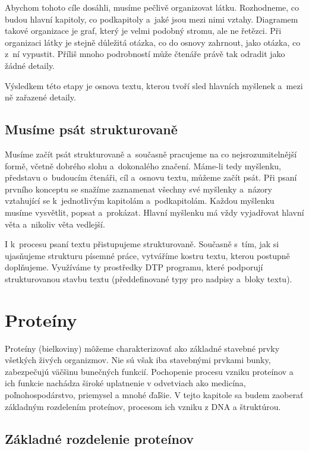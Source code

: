 Abychom tohoto cíle dosáhli, musíme pečlivě organizovat látku. Rozhodneme, co budou hlavní kapitoly, co podkapitoly a~jaké jsou mezi nimi vztahy. Diagramem takové organizace je graf, který je velmi podobný stromu, ale ne řetězci. Při organizaci látky je stejně důležitá otázka, co do osnovy zahrnout, jako otázka, co z~ní vypustit. Příliš mnoho podrobností může čtenáře právě tak odradit jako žádné detaily.

Výsledkem této etapy je osnova textu, kterou tvoří sled hlavních myšlenek a~mezi ně zařazené detaily.

\section{Musíme psát strukturovaně} 
Musíme začít psát strukturovaně a~současně pracujeme na co nejsrozumitelnější formě, včetně dobrého slohu a~dokonalého značení. 
Máme-li tedy myšlenku, představu o~budoucím čtenáři, cíl a~osnovu textu, můžeme začít psát. Při psaní prvního konceptu se snažíme zaznamenat všechny své myšlenky a~názory vztahující se k~jednotlivým kapitolám a~podkapitolám. Každou myšlenku musíme vysvětlit, popsat a~prokázat. Hlavní myšlenku má vždy vyjadřovat hlavní věta a~nikoliv věta vedlejší.

I k~procesu psaní textu přistupujeme strukturovaně. Současně s~tím, jak si ujasňujeme strukturu písemné práce, vytváříme kostru textu, kterou postupně doplňujeme. Využíváme ty prostředky DTP programu, které podporují strukturovanou stavbu textu (předdefinované typy pro nadpisy a~bloky textu). 


\chapter{Proteíny}

Proteíny (bielkoviny) môžeme charakterizovať ako základné stavebné prvky všetkých živých organizmov. Nie sú však iba stavebnými prvkami bunky, zabezpečujú väčšinu bunečných funkcií. Pochopenie procesu vzniku proteínov a ich funkcie nachádza široké uplatnenie v odvetviach ako medicína, poľnohospodárstvo, priemysel a mnohé ďaľšie. 
V tejto kapitole sa budem zaoberať základným rozdelením proteínov, procesom ich vzniku z DNA a štruktúrou.

\section{Základné rozdelenie proteínov}

